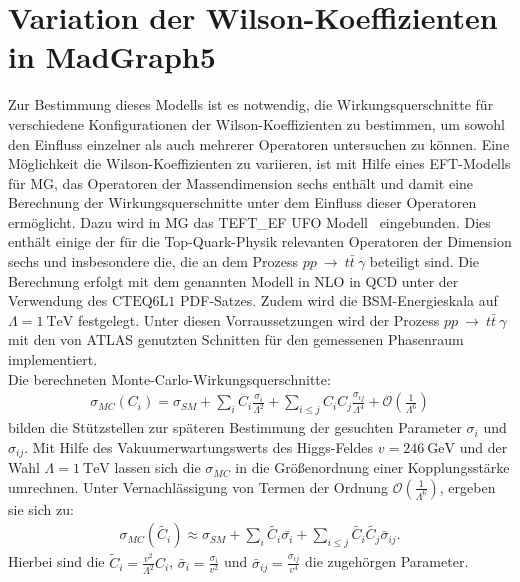 \section{Variation der Wilson-Koeffizienten in MadGraph5}%
%
Zur Bestimmung dieses Modells ist es notwendig, die Wirkungsquerschnitte für verschiedene Konfigurationen der Wilson-Koeffizienten zu bestimmen, um sowohl den Einfluss einzelner als auch mehrerer Operatoren untersuchen zu können.
Eine Möglichkeit die Wilson-Koeffizienten zu variieren, ist mit Hilfe eines  EFT-Modells für MG, das Operatoren der Massendimension sechs enthält und damit eine Berechnung der Wirkungsquerschnitte unter dem Einfluss dieser Operatoren ermöglicht. Dazu wird in MG das TEFT\_EF UFO Modell~ eingebunden.
Dies enthält einige der für die Top-Quark-Physik relevanten Operatoren der Dimension sechs und insbesondere die, die an dem Prozess $pp~\rightarrow~t\bar{t}~\gamma$ beteiligt sind.
Die Berechnung erfolgt mit dem genannten Modell in NLO in QCD unter der Verwendung des $\text{CTEQ}6\text{L}1$ PDF-Satzes.
Zudem wird die BSM-Energieskala auf $\Lambda = \SI{1}{\tera\electronvolt}$ festgelegt.
Unter diesen Vorraussetzungen wird der Prozess $pp~\rightarrow~t\bar{t}~\gamma$ mit den von ATLAS genutzten Schnitten für den gemessenen Phasenraum implementiert.\\
Die berechneten Monte-Carlo-Wirkungsquerschnitte:
\begin{align}
  \sigma_{MC}({C_i}) = \sigma_{SM} + \sum_{i} C_i \frac{\sigma_i}{\Lambda^2} + \sum_{i \leq j} C_i C_j \frac{\sigma_{ij}}{\Lambda^4} + \mathcal{O}\left(\frac{1}{\Lambda^6}\right)
\end{align}
bilden die Stützstellen zur späteren Bestimmung der gesuchten Parameter $\sigma_i$ und $\sigma_{ij}$.
Mit Hilfe des Vakuumerwartungswerts des Higgs-Feldes $v = \SI{246}{\giga\electronvolt}$ und der Wahl $\Lambda = \SI{1}{\tera\electronvolt}$ lassen sich die $\sigma_{MC}$ in die Größenordnung einer Kopplungsstärke umrechnen.
Unter Vernachlässigung von Termen der Ordnung $\mathcal{O}(\frac{1}{\Lambda^6})$, ergeben sie sich zu:
\begin{align}
  \sigma_{MC}({\tilde{C_i}}) \approx \sigma_{SM} + \sum_{i} \tilde{C_i} \bar{\sigma_i} + \sum_{i \leq j} \tilde{C_i} \tilde{C_j} \bar{\sigma}_{ij}.
\end{align}
Hierbei sind die $\tilde{C}_i = \frac{v^2}{\Lambda^2} C_i$, $\bar{\sigma}_i = \frac{\sigma_i}{v^2}$ und $\bar{\sigma}_{ij} = \frac{\sigma_{ij}}{v^4}$ die zugehörgen Parameter.
